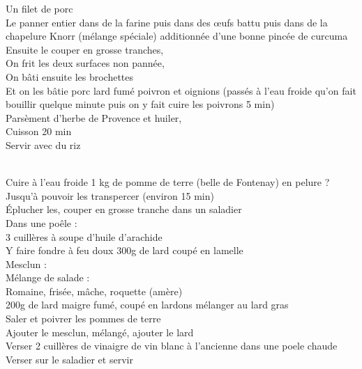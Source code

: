 \begin{minipage}[c]{\textwidth}
Un filet de porc\\
Le panner entier dans de la farine puis dans des œufs battu puis dans de la chapelure Knorr (mélange spéciale) additionnée d'une bonne pincée de curcuma\\
Ensuite le couper en grosse tranches,\\
On frit les deux surfaces non pannée,\\
On bâti ensuite les brochettes\\
Et on les bâtie porc lard fumé poivron et oignions (passés à l'eau froide qu'on fait bouillir quelque minute puis on y fait cuire les poivrons 5 min)\\
Parsèment d'herbe de Provence et huiler,\\
Cuisson 20 min\\
Servir avec du riz\\
\\

\end{minipage}

\begin{minipage}[c]{\textwidth}
Cuire à l'eau froide 1 kg de pomme de terre (belle de Fontenay) en pelure ? Jusqu’à pouvoir les transpercer (environ 15 min)\\
Éplucher les, couper en grosse tranche dans un saladier\\
Dans une poêle :\\
3 cuillères à soupe d'huile d'arachide\\
Y faire fondre à feu doux 300g de lard coupé en lamelle\\
Mesclun :\\
    Mélange de salade :\\
        Romaine, frisée, mâche, roquette (amère)\\
    200g de lard maigre fumé, coupé en lardons mélanger au lard gras\\
Saler et poivrer les pommes de terre\\
Ajouter le mesclun, mélangé, ajouter le lard\\
Verser 2 cuillères de vinaigre de vin blanc à l'ancienne dans une poele chaude\\
Verser sur le saladier et servir\\
\\

\end{minipage}

